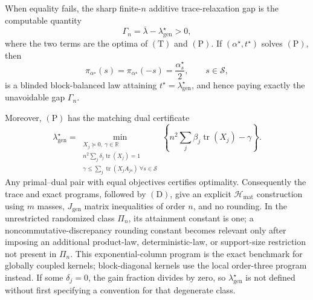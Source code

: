 When equality fails, the sharp finite-\(n\) additive trace-relaxation gap is the computable quantity
\[
\Gamma_n=\overline\lambda-\lambda_{\mathrm{gen}}^\star>0,
\tag{G}
\]
where the two terms are the optima of \((\mathrm T)\) and \((\mathrm P)\). If \((\alpha^\star,t^\star)\) solves \((\mathrm P)\), then
\[
\pi_{\alpha^\star}(s)=\pi_{\alpha^\star}(-s)=\frac{\alpha_s^\star}{2},
\qquad s\in\mathscr S,
\tag{D}
\]
is a blinded block-balanced law attaining \(t^\star=\lambda_{\mathrm{gen}}^\star\), and hence paying exactly the unavoidable gap \(\Gamma_n\).

Moreover, \((\mathrm P)\) has the matching dual certificate
\[
\lambda_{\mathrm{gen}}^\star
=\min_{\substack{X_j\succeq0,\ \gamma\in\mathbb R\\
n^2\sum_j\delta_j\operatorname{tr}(X_j)=1\\
\gamma\le\sum_j\operatorname{tr}(X_jA_{js})\ \forall s\in\mathscr S}}
\left\{
n^2\sum_j\beta_j\operatorname{tr}(X_j)-\gamma
\right\}.
\tag{C}
\]
Any primal--dual pair with equal objectives certifies optimality. Consequently the trace and exact programs, followed by \((\mathrm D)\), give an explicit \(\mathcal H_{\mathrm{mat}}\) construction using \(m\) masses, \(J_{\mathrm{gen}}\) matrix inequalities of order \(n\), and no rounding. In the unrestricted randomized class \(\Pi_n\), its attainment constant is one; a noncommutative-discrepancy rounding constant becomes relevant only after imposing an additional product-law, deterministic-law, or support-size restriction not present in \(\Pi_n\). This exponential-column program is the exact benchmark for globally coupled kernels; block-diagonal kernels use the local order-three program instead. If some \(\delta_j=0\), the gain fraction divides by zero, so \(\lambda_{\mathrm{gen}}^\star\) is not defined without first specifying a convention for that degenerate class.